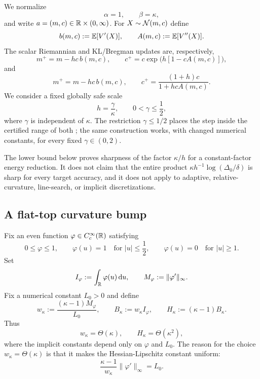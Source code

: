 We normalize
\[
    \alpha=1,
    \qquad
    \beta=\kappa,
\]
and write $a=(m,c)\in\mathbb{R}\times(0,\infty)$.  For
$X\sim\mathcal{N}(m,c)$ define
\begin{equation}
\label{eq:disc-sharp-bA}
    b(m,c):=\mathbb{E}[V'(X)],
    \qquad
    A(m,c):=\mathbb{E}[V''(X)].
\end{equation}
The scalar Riemannian and KL/Bregman updates are, respectively,
\begin{equation}
\label{eq:disc-sharp-R-map}
    m^+=m-hc\,b(m,c),
    \qquad
    c^+=c\exp\bigl(h[1-cA(m,c)]\bigr),
\end{equation}
and
\begin{equation}
\label{eq:disc-sharp-KL-map}
    m^+=m-hc\,b(m,c),
    \qquad
    c^+=\frac{(1+h)c}{1+hcA(m,c)}.
\end{equation}
We consider a fixed globally safe scale
\begin{equation}
\label{eq:disc-sharp-step}
    h=\frac{\gamma}{\kappa},
    \qquad
    0<\gamma\leq\frac12,
\end{equation}
where $\gamma$ is independent of $\kappa$.  The restriction $\gamma\leq1/2$ places the
step inside the certified range of both ; the same
construction works, with changed numerical constants, for every fixed $\gamma\in(0,2)$.

The lower bound below proves sharpness of the factor $\kappa/h$ for a constant-factor
energy reduction.  It does not claim that the entire product
$\kappa h^{-1}\log(\Delta_0/\delta)$ is sharp for every target accuracy, and it does not
apply to adaptive, relative-curvature, line-search, or implicit discretizations.

\subsection{A flat-top curvature bump}

Fix an even function $\varphi\in C_c^\infty(\mathbb{R})$ satisfying
\begin{equation}
\label{eq:flat-bump}
    0\leq\varphi\leq1,
    \qquad
    \varphi(u)=1\quad\text{for }|u|\leq\frac12,
    \qquad
    \varphi(u)=0\quad\text{for }|u|\geq1.
\end{equation}
Set
\[
    I_\varphi:=\int_{\mathbb{R}}\varphi(u)\,\mathrm{d} u,
    \qquad
    M_\varphi:=\|\varphi'\|_\infty.
\]
Fix a numerical constant $L_0>0$ and define
\begin{equation}
\label{eq:bump-width-mass}
    w_\kappa:=\frac{(\kappa-1)M_\varphi}{L_0},
    \qquad
    B_\kappa:=w_\kappa I_\varphi,
    \qquad
    H_\kappa:=(\kappa-1)B_\kappa.
\end{equation}
Thus
\begin{equation}
\label{eq:bump-scales}
    w_\kappa=\Theta(\kappa),
    \qquad
    H_\kappa=\Theta(\kappa^2),
\end{equation}
where the implicit constants depend only on $\varphi$ and $L_0$.  The reason for the
choice $w_\kappa=\Theta(\kappa)$ is that it makes the Hessian-Lipschitz constant uniform:
\begin{equation}
\label{eq:bump-LH}
    \frac{\kappa-1}{w_\kappa}\|\varphi'\|_\infty=L_0.
\end{equation}

